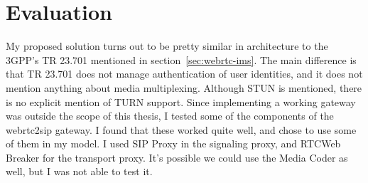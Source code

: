 \section{Evaluation}
My proposed solution turns out to be pretty similar in architecture to the 3GPP's TR 23.701\cite{3gpp-wrtc-access-ims} mentioned in section~\ref{sec:webrtc-ims}. The main difference is that TR 23.701 does not manage authentication of user identities, and it does not mention anything about media multiplexing. Although STUN is mentioned, there is no explicit mention of TURN support. Since implementing a working gateway was outside the scope of this thesis, I tested some of the components of the webrtc2sip gateway. I found that these worked quite well, and chose to use some of them in my model. I used SIP Proxy in the signaling proxy, and RTCWeb Breaker for the transport proxy. It's possible we could use the Media Coder as well, but I was not able to test it.